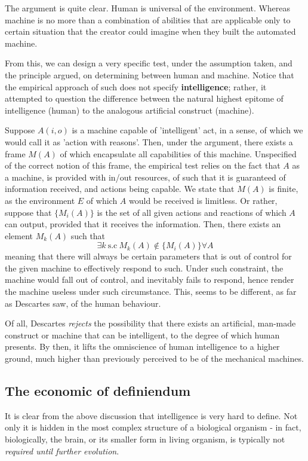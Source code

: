 The argument is quite clear. Human is universal of the environment. Whereas machine is no more than a combination of abilities that are applicable only to certain situation that the creator could imagine when they built the automated machine. 

From this, we can design a very specific test, under the assumption taken, and the principle argued, on determining between human and machine. Notice that the empirical approach of such does not specify \textbf{intelligence}; rather, it attempted to question the difference between the natural highest epitome of intelligence (human) to the analogous artificial construct (machine). 

Suppose $A(i,o)$ is a machine capable of 'intelligent' act, in a sense, of which we would call it as 'action with reasons'. Then, under the argument, there exists a frame $M(A)$ of which encapsulate all capabilities of this machine. Unspecified of the correct notion of this frame, the empirical test relies on the fact that $A$ as a machine, is provided with in/out resources, of such that it is guaranteed of information received, and actions being capable. We state that $M(A)$ is finite, as the environment $E$ of which $A$ would be received is limitless. Or rather, suppose that $\{M_{i}(A)\}$ is the set of all given actions and reactions of which $A$ can output, provided that it receives the information. Then, there exists an element $M_{k}(A)$ such that $$\exists k \: \text{s.c}\:M_{k}(A)\notin \{M_{i}(A)\}\forall A$$ meaning that there will always be certain parameters that is out of control for the given machine to effectively respond to such. Under such constraint, the machine would fall out of control, and inevitably fails to respond, hence render the machine useless under such circumstance. This, seems to be different, as far as Descartes saw, of the human behaviour. 

Of all, Descartes \textit{rejects} the possibility that there exists an artificial, man-made construct or machine that can be intelligent, to the degree of which human presents. By then, it lifts the omniscience of human intelligence to a higher ground, much higher than previously perceived to be of the mechanical machines. 

\subsection{The economic of definiendum} 

It is clear from the above discussion that intelligence is very hard to define. Not only it is hidden in the most complex structure of a biological organism - in fact, biologically, the brain, or its smaller form in living organism, is typically not \textit{required until further evolution}. 

